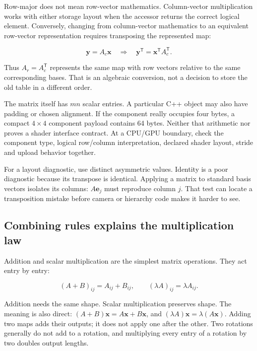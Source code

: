 Row-major does not mean row-vector mathematics. Column-vector multiplication works with either storage layout when the accessor returns the correct logical element. Conversely, changing from column-vector mathematics to an equivalent row-vector representation requires transposing the represented map:

\[
\mathbf y=A_c\mathbf x
\quad\Longrightarrow\quad
\mathbf y^{\mathsf T}=\mathbf x^{\mathsf T}A_c^{\mathsf T}.
\]

Thus \(A_r=A_c^{\mathsf T}\) represents the same map with row vectors relative to the same corresponding bases. That is an algebraic conversion, not a decision to store the old table in a different order.

The matrix itself has \(mn\) scalar entries. A particular C++ object may also have padding or chosen alignment. If the component really occupies four bytes, a compact \(4\times4\) component payload contains 64 bytes. Neither that arithmetic nor  proves a shader interface contract. At a CPU/GPU boundary, check the component type, logical row/column interpretation, declared shader layout, stride and upload behavior together.

For a layout diagnostic, use distinct asymmetric values. Identity is a poor diagnostic because its transpose is identical. Applying a matrix to standard basis vectors isolates its columns: \(A\mathbf e_j\) must reproduce column \(j\). That test can locate a transposition mistake before camera or hierarchy code makes it harder to see.

\subsection{Combining rules explains the multiplication law}\label{01-foundations-i-ch018-combining-rules-explains-the-multiplication-law}

\hypertarget{01-foundations-i-ch018-combining-rules-explains-the-multiplication-law}{}

Addition and scalar multiplication are the simplest matrix operations. They act entry by entry:

\[
(A+B)_{ij}=A_{ij}+B_{ij},\qquad
(\lambda A)_{ij}=\lambda A_{ij}.
\]

Addition needs the same shape. Scalar multiplication preserves shape. The meaning is also direct: \((A+B)\mathbf x=A\mathbf x+B\mathbf x\), and \((\lambda A)\mathbf x=\lambda(A\mathbf x)\). Adding two maps adds their outputs; it does not apply one after the other. Two rotations generally do not add to a rotation, and multiplying every entry of a rotation by two doubles output lengths.

